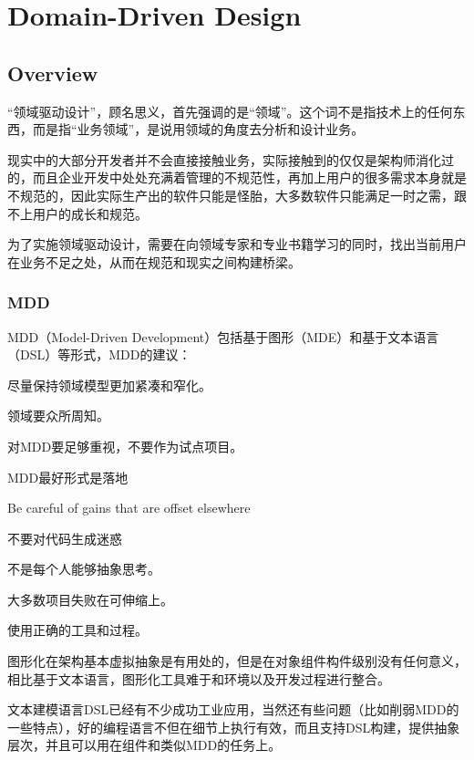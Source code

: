\part{Domain-Driven Design}

\chapter{Overview}




“领域驱动设计”，顾名思义，首先强调的是“领域”。这个词不是指技术上的任何东西，而是指“业务领域”，是说用领域的角度去分析和设计业务。
 
现实中的大部分开发者并不会直接接触业务，实际接触到的仅仅是架构师消化过的，而且企业开发中处处充满着管理的不规范性，再加上用户的很多需求本身就是不规范的，因此实际生产出的软件只能是怪胎，大多数软件只能满足一时之需，跟不上用户的成长和规范。

为了实施领域驱动设计，需要在向领域专家和专业书籍学习的同时，找出当前用户在业务不足之处，从而在规范和现实之间构建桥梁。



\section{MDD}

MDD（Model-Driven Development）包括基于图形（MDE）和基于文本语言（DSL）等形式，MDD的建议：

\begin{compactitem}
\item 尽量保持领域模型更加紧凑和窄化。
\item 领域要众所周知。
\item 对MDD要足够重视，不要作为试点项目。
\item MDD最好形式是落地
\item Be careful of gains that are offset elsewhere
\item 不要对代码生成迷惑
\item 不是每个人能够抽象思考。
\item 大多数项目失败在可伸缩上。
\item 使用正确的工具和过程。
\end{compactitem}

图形化在架构基本虚拟抽象是有用处的，但是在对象组件构件级别没有任何意义，相比基于文本语言，图形化工具难于和环境以及开发过程进行整合。



文本建模语言DSL已经有不少成功工业应用，当然还有些问题（比如削弱MDD的一些特点），好的编程语言不但在细节上执行有效，而且支持DSL构建，提供抽象层次，并且可以用在组件和类似MDD的任务上。



